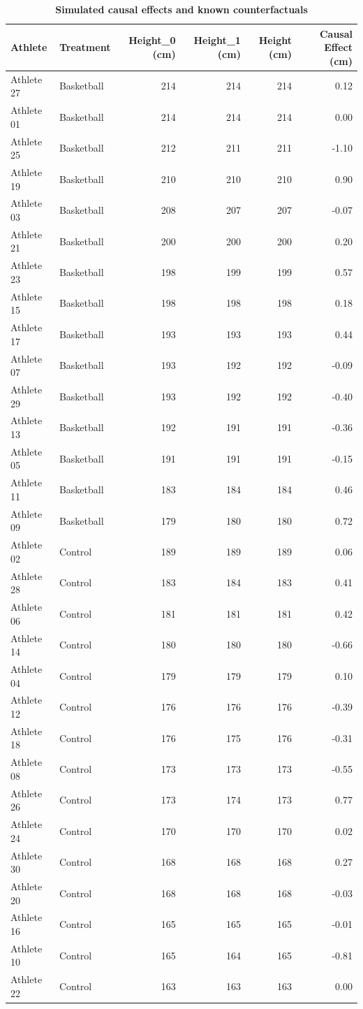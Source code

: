 \documentclass[
]{book}
\begin{document}
\begin{table}

\caption{\label{tab:table-counterfactuals-simulated}\textbf{Simulated causal effects and known counterfactuals}}
\centering
\begin{tabular}[t]{llrrrr}
\toprule
Athlete & Treatment & Height\_0 (cm) & Height\_1 (cm) & Height (cm) & Causal Effect (cm)\\
\midrule
Athlete 27 & Basketball & 214 & 214 & 214 & 0.12\\
Athlete 01 & Basketball & 214 & 214 & 214 & 0.00\\
Athlete 25 & Basketball & 212 & 211 & 211 & -1.10\\
Athlete 19 & Basketball & 210 & 210 & 210 & 0.90\\
Athlete 03 & Basketball & 208 & 207 & 207 & -0.07\\
\addlinespace
Athlete 21 & Basketball & 200 & 200 & 200 & 0.20\\
Athlete 23 & Basketball & 198 & 199 & 199 & 0.57\\
Athlete 15 & Basketball & 198 & 198 & 198 & 0.18\\
Athlete 17 & Basketball & 193 & 193 & 193 & 0.44\\
Athlete 07 & Basketball & 193 & 192 & 192 & -0.09\\
\addlinespace
Athlete 29 & Basketball & 193 & 192 & 192 & -0.40\\
Athlete 13 & Basketball & 192 & 191 & 191 & -0.36\\
Athlete 05 & Basketball & 191 & 191 & 191 & -0.15\\
Athlete 11 & Basketball & 183 & 184 & 184 & 0.46\\
Athlete 09 & Basketball & 179 & 180 & 180 & 0.72\\
\addlinespace
Athlete 02 & Control & 189 & 189 & 189 & 0.06\\
Athlete 28 & Control & 183 & 184 & 183 & 0.41\\
Athlete 06 & Control & 181 & 181 & 181 & 0.42\\
Athlete 14 & Control & 180 & 180 & 180 & -0.66\\
Athlete 04 & Control & 179 & 179 & 179 & 0.10\\
\addlinespace
Athlete 12 & Control & 176 & 176 & 176 & -0.39\\
Athlete 18 & Control & 176 & 175 & 176 & -0.31\\
Athlete 08 & Control & 173 & 173 & 173 & -0.55\\
Athlete 26 & Control & 173 & 174 & 173 & 0.77\\
Athlete 24 & Control & 170 & 170 & 170 & 0.02\\
\addlinespace
Athlete 30 & Control & 168 & 168 & 168 & 0.27\\
Athlete 20 & Control & 168 & 168 & 168 & -0.03\\
Athlete 16 & Control & 165 & 165 & 165 & -0.01\\
Athlete 10 & Control & 165 & 164 & 165 & -0.81\\
Athlete 22 & Control & 163 & 163 & 163 & 0.00\\
\bottomrule
\end{tabular}
\end{table}
\end{document}
